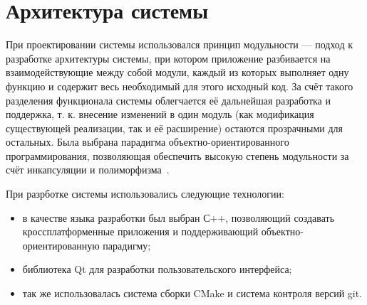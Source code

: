 \documentclass[a4paper,12pt]{extarticle}
\let\stdsection\section
\renewcommand\section{
    \newpage
    \stdsection
}
\begin{document}
\section{Архитектура системы}
\label{sec:architecture}

При проектировании системы использовался принцип модульности --- подход к разработке архитектуры системы, при котором приложение разбивается на взаимодействующие между собой модули, каждый из которых выполняет одну функцию и содержит весь необходимый для этого исходный код. За счёт такого разделения функционала системы облегчается её дальнейшая разработка и поддержка, т. к. внесение изменений в один модуль (как модификация существующей реализации, так и её расширение) остаются прозрачными для остальных. Была выбрана парадигма объектно-ориентированного программирования, позволяющая обеспечить высокую степень модульности за счёт инкапсуляции и полиморфизма~\cite{booch}.


При разрботке системы использовались следующие технологии:
\begin{itemize}
    \item в качестве языка разработки был выбран С++, позволяющий создавать кроссплатформенные приложения и поддерживающий объектно-ориентированную парадигму;
    \item библиотека Qt для разработки пользовательского интерфейса;
    \item так же использовалась система сборки CMake и система контроля версий git.
\end{itemize}
\end{document}
